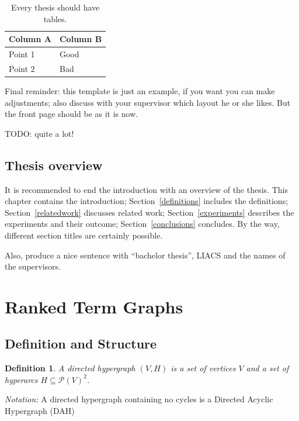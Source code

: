 \documentclass[12pt]{article}
\newtheorem{definition}{Definition}[section]
\renewcommand{\P}{\mathcal{P}}
\newcommand{\1}{\mathbbm{1}}
\begin{document}
\begin{table}[!htbp]
\begin{center}
\begin{tabular}{l|l}
Column A & Column B\\
\hline
Point 1 & Good\\
Point 2 & Bad
\end{tabular}
\end{center}
\caption{Every thesis should have tables.}\label{atable}
\end{table}

Final reminder: this template is just an example, if you want you can make adjustments; also discuss with your supervisor which layout he or she likes. But the front page should be as it is now.

TODO: quite a lot!

\subsection{Thesis overview}
It is recommended to end the introduction with an overview of the thesis. This chapter contains the introduction; Section~\ref{definitions} includes the definitions; Section~\ref{relatedwork} discusses related work; Section~\ref{experiments} describes the experiments and their outcome; Section~\ref{conclusions} concludes. By the way, different section titles are certainly possible.

Also, produce a nice sentence with ``bachelor thesis'', LIACS and the names of the supervisors.
\section{Ranked Term Graphs}

\subsection{Definition and Structure}
\begin{definition}
    A directed \emph{hypergraph} $(V,H)$ is a set of vertices $V$ and a set of \emph{hyperarcs} $H\subseteq \P(V)^2$.
\end{definition}

\emph{Notation:} A directed hypergraph containing no cycles is a Directed Acyclic Hypergraph (DAH)\\
\end{document}
